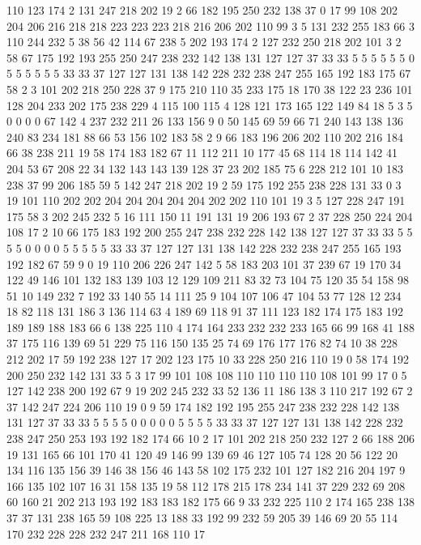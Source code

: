 110 123 174 2 131 247 218 202 19 2 66 182 195 250 232 138 37 0 17 99
108 202 204 206 216 218 218 223 223 223 218 216 206 202 110 99 3 5 131 232
255 183 66 3 110 244 232 5 38 56 42 114 67 238 5 202 193 174 2 127
232 250 218 202 101 3 2 58 67 175 192 193 255 250 247 238 232 142 138 131
127 127 37 33 33 5 5 5 5 5 5 0 5 5 5 5 5 5 33 33
37 127 127 131 138 142 228 232 238 247 255 165 192 183 175 67 58 2 3 101
202 218 250 228 37 9 175 210 110 35 233 175 18 170 38 122 23 236 101 128
204 233 202 175 238 229 4 115 100 115 4 128 121 173 165 122 149 84 18 5
3 5 0 0 0 0 67 142 4 237 232 211 26 133 156 9 0 50 145 69
59 66 71 240 143 138 136 240 83 234 181 88 66 53 156 102 183 58 2 9
66 183 196 206 202 110 202 216 184 66 38 238 211 19 58 174 183 182 67 11
112 211 10 177 45 68 114 18 114 142 41 204 53 67 208 22 34 132 143 143
139 128 37 23 202 185 75 6 228 212 101 10 183 238 37 99 206 185 59 5
142 247 218 202 19 2 59 175 192 255 238 228 131 33 0 3 19 101 110 202
202 204 204 204 204 204 202 202 110 101 19 3 5 127 228 247 191 175 58 3
202 245 232 5 16 111 150 11 191 131 19 206 193 67 2 37 228 250 224 204
108 17 2 10 66 175 183 192 200 255 247 238 232 228 142 138 127 127 37 33
33 5 5 5 5 0 0 0 0 5 5 5 5 5 33 33 37 127 127 131
138 142 228 232 238 247 255 165 193 192 182 67 59 9 0 19 110 206 226 247
142 5 58 183 203 101 37 239 67 19 170 34 122 49 146 101 132 183 139 103
12 129 109 211 83 32 73 104 75 120 35 54 158 98 51 10 149 232 7 192
33 140 55 14 111 25 9 104 107 106 47 104 53 77 128 12 234 18 82 118
131 186 3 136 114 63 4 189 69 118 91 37 111 123 182 174 175 183 192 189
189 188 183 66 6 138 225 110 4 174 164 233 232 232 233 165 66 99 168 41
188 37 175 116 139 69 51 229 75 116 150 135 25 74 69 176 177 176 82 74
10 38 228 212 202 17 59 192 238 127 17 202 123 175 10 33 228 250 216 110
19 0 58 174 192 200 250 232 142 131 33 5 3 17 99 101 108 108 110 110
110 110 108 101 99 17 0 5 127 142 238 200 192 67 9 19 202 245 232 33
52 136 11 186 138 3 110 217 192 67 2 37 142 247 224 206 110 19 0 9
59 174 182 192 195 255 247 238 232 228 142 138 131 127 37 33 33 5 5 5
5 0 0 0 0 0 5 5 5 5 33 33 37 127 127 131 138 142 228 232
238 247 250 253 193 192 182 174 66 10 2 17 101 202 218 250 232 127 2 66
188 206 19 131 165 66 101 170 41 120 49 146 99 139 69 46 127 105 74 128
20 56 122 20 134 116 135 156 39 146 38 156 46 143 58 102 175 232 101 127
182 216 204 197 9 166 135 102 107 16 31 158 135 19 58 112 178 215 178 234
141 37 229 232 69 208 60 160 21 202 213 193 192 183 183 182 175 66 9 33
232 225 110 2 174 165 238 138 37 37 131 238 165 59 108 225 13 188 33 192
99 232 59 205 39 146 69 20 55 114 170 232 228 228 232 247 211 168 110 17
